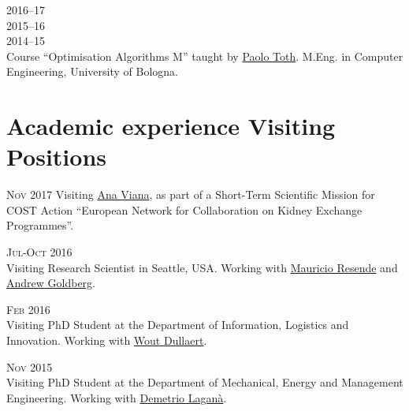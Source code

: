 \begin{paracol}{2}
  \textsc{2016--17\\2015--16\\2014--15}
\switchcolumn
  \\
  Course ``Optimisation Algorithms M'' taught by \href{https://scholar.google.com/citations?user=2IPL4XIAAAAJ}{Paolo Toth}. M.Eng. in Computer Engineering, University of Bologna.
\end{paracol}

\section*{Academic experience {\small Visiting Positions}}

\begin{paracol}{2}
  \textsc{Nov 2017}
\switchcolumn
  Visiting \href{https://scholar.google.com/citations?user=RW7QevYAAAAJ}{Ana Viana}, as part of a Short-Term Scientific Mission for COST Action ``European Network for Collaboration on Kidney Exchange Programmes''.
\end{paracol}

\begin{paracol}{2}
  \textsc{Jul-Oct 2016}
\switchcolumn
  \\
  Visiting Research Scientist in Seattle, USA. Working with \href{https://scholar.google.com/citations?user=KTmPx50AAAAJ}{Mauricio Resende} and \href{https://scholar.google.it/citations?user=U5iFVowAAAAJ}{Andrew Goldberg}.
\end{paracol}

\begin{paracol}{2}
  \textsc{Feb 2016}
\switchcolumn
  \\
  Visiting PhD Student at the Department of Information, Logistics and Innovation. Working with \href{https://scholar.google.com/citations?user=wjjCd5UAAAAJ}{Wout Dullaert}.
\end{paracol}

\begin{paracol}{2}
  \textsc{Nov 2015}
\switchcolumn
  \\
  Visiting PhD Student at the Department of Mechanical, Energy and Management Engineering. Working with \href{https://scholar.google.com/citations?user=r_qFOqgAAAAJ}{Demetrio Laganà}.
\end{paracol}

